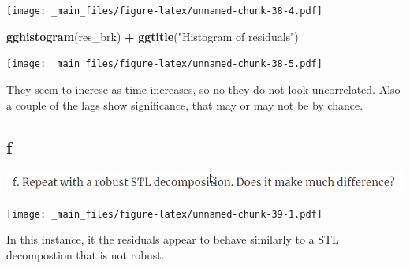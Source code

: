 \documentclass[]{book}
\newenvironment{Shaded}{\begin{snugshade}}{\end{snugshade}}
\newcommand{\DataTypeTok}[1]{\textcolor[rgb]{0.13,0.29,0.53}{#1}}
\newcommand{\DecValTok}[1]{\textcolor[rgb]{0.00,0.00,0.81}{#1}}
\newcommand{\KeywordTok}[1]{\textcolor[rgb]{0.13,0.29,0.53}{\textbf{#1}}}
\newcommand{\NormalTok}[1]{#1}
\newcommand{\OperatorTok}[1]{\textcolor[rgb]{0.81,0.36,0.00}{\textbf{#1}}}
\newcommand{\OtherTok}[1]{\textcolor[rgb]{0.56,0.35,0.01}{#1}}
\newcommand{\StringTok}[1]{\textcolor[rgb]{0.31,0.60,0.02}{#1}}
\begin{document}
\texttt{[image: \_main\_files/figure-latex/unnamed-chunk-38-4.pdf]}

\begin{Shaded}
\begin{Highlighting}[]
\KeywordTok{gghistogram}\NormalTok{(res_brk) }\OperatorTok{+}\StringTok{ }\KeywordTok{ggtitle}\NormalTok{(}\StringTok{"Histogram of residuals"}\NormalTok{)}
\end{Highlighting}
\end{Shaded}

\texttt{[image: \_main\_files/figure-latex/unnamed-chunk-38-5.pdf]}

They seem to increse as time increases, so no they do not look uncorrelated. Also a couple of the lags show significance, that may or may not be by chance.

\hypertarget{f-2}{%
\subsection{f}\label{f-2}}

\includegraphics{./week2/6.6f.png}

\begin{Shaded}
\end{Shaded}

\texttt{[image: \_main\_files/figure-latex/unnamed-chunk-39-1.pdf]}

In this instance, it the residuals appear to behave similarly to a STL decompostion that is not robust.

\begin{Shaded}
\end{Shaded}
\end{document}
